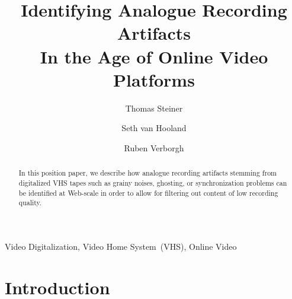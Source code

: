 \documentclass[runningheads,a4paper]{llncs}
\newcommand{\keywords}[1]{\par\addvspace\baselineskip
\noindent\keywordname\enspace\ignorespaces#1}
\begin{document}
\mainmatter

\title{Identifying Analogue Recording Artifacts\\
In the Age of Online Video Platforms}

\author{Thomas Steiner \and
        Seth van Hooland \and
        Ruben Verborgh}


\maketitle

\setcounter{footnote}{0}

\begin{abstract}
In this position paper, we describe how analogue recording artifacts
stemming from digitalized VHS tapes such as
grainy noises, ghosting, or synchronization problems
can be identified at Web-scale in order to
allow for filtering out content of low recording quality.
\end{abstract}

\keywords{Video Digitalization, Video Home System~(VHS), Online Video}

\section{Introduction}
\end{document}
